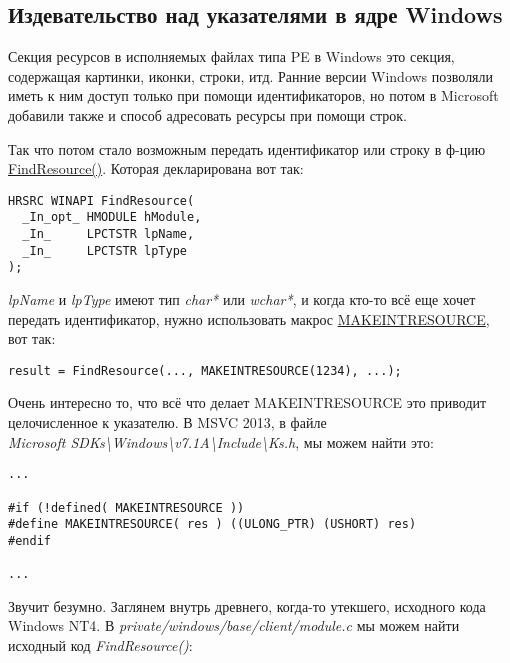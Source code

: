 \subsection{Издевательство над указателями в ядре Windows}

Секция ресурсов в исполняемых файлах типа PE в Windows это секция, содержащая картинки, иконки, строки, итд.
Ранние версии Windows позволяли иметь к ним доступ только при помощи идентификаторов, но потом в Microsoft добавили
также и способ адресовать ресурсы при помощи строк.

Так что потом стало возможным передать идентификатор или строку в ф-цию
\href{https://msdn.microsoft.com/en-us/library/windows/desktop/ms648042%28v=vs.85%29.aspx}{FindResource()}.
Которая декларирована вот так:


\begin{lstlisting}[style=customc]
HRSRC WINAPI FindResource(
  _In_opt_ HMODULE hModule,
  _In_     LPCTSTR lpName,
  _In_     LPCTSTR lpType
);
\end{lstlisting}

\emph{lpName} и \emph{lpType} имеют тип \emph{char*} или \emph{wchar*}, и когда кто-то всё еще хочет передать идентификатор,
нужно использовать макрос
\href{https://msdn.microsoft.com/en-us/library/windows/desktop/ms648029%28v=vs.85%29.aspx}{MAKEINTRESOURCE}, вот так:


\begin{lstlisting}[style=customc]
result = FindResource(..., MAKEINTRESOURCE(1234), ...);
\end{lstlisting}

Очень интересно то, что всё что делает MAKEINTRESOURCE это приводит целочисленное к указателю.
В MSVC 2013, в файле\\
\emph{Microsoft SDKs\textbackslash{}Windows\textbackslash{}v7.1A\textbackslash{}Include\textbackslash{}Ks.h},
мы можем найти это:

\begin{lstlisting}[style=customc]
...

#if (!defined( MAKEINTRESOURCE )) 
#define MAKEINTRESOURCE( res ) ((ULONG_PTR) (USHORT) res)
#endif

...
\end{lstlisting}

Звучит безумно. Заглянем внутрь древнего, когда-то утекшего, исходного кода Windows NT4.
В \emph{private/windows/base/client/module.c} мы можем найти исходный код \emph{FindResource()}:


